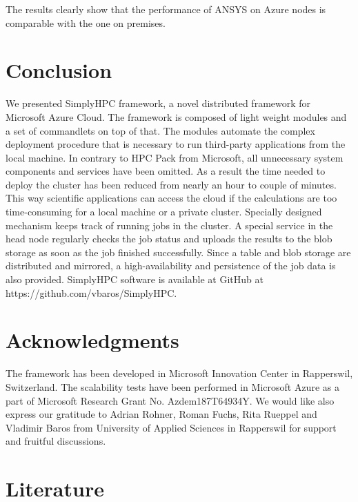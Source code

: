 \documentclass[3p,times]{elsarticle}
\begin{document}
The results clearly show that the performance of ANSYS on Azure nodes is comparable with the one on premises.




\section{Conclusion}
\label{sec:conclusions}

We presented SimplyHPC framework, a novel distributed framework for Microsoft Azure Cloud. The framework is composed of light weight modules and a set of commandlets on top of that. The modules automate the complex deployment procedure that is necessary to run third-party applications from the local machine. In contrary to HPC Pack from Microsoft, all unnecessary system components and services have been omitted. As a result the time needed to deploy the cluster has been reduced from nearly an hour to couple of minutes.  This way scientific applications can access the cloud if the calculations are too time-consuming for a local machine or a private cluster. Specially designed mechanism keeps track of running jobs in the cluster. A special service in the head node regularly checks the job status and uploads the results to the blob storage as soon as the job finished successfully. Since a table and blob storage are distributed and mirrored, a high-availability and persistence of the job data is also provided. SimplyHPC software is available at GitHub at https://github.com/vbaros/SimplyHPC.



\section{Acknowledgments}
\label{sec:ackn}

The framework has been developed in Microsoft Innovation Center in Rapperswil, Switzerland. The scalability tests have been performed in Microsoft Azure as a part of Microsoft Research Grant No. Azdem187T64934Y. We would like also express our gratitude to Adrian Rohner, Roman Fuchs, Rita Rueppel and Vladimir Baros from University of Applied Sciences in Rapperswil for support and fruitful discussions.

\section{Literature}
\label{sec:literature}



\end{document}
